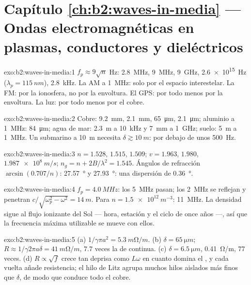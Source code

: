\section*{Capítulo \ref{ch:b2:waves-in-media} --- Ondas electromagnéticas en plasmas, conductores y dieléctricos}

\begin{solution}{exo:b2:waves-in-media:1}
$f_p \approx 9\sqrt n$ Hz: \qty{2.8}{MHz}, \qty{9}{MHz}, \qty{9}{GHz}, \qty{2.6e15}{Hz}
($\lambda_p = \qty{115}{nm}$), \qty{2.8}{kHz}. La AM a \qty{1}{MHz}: solo por el
espacio interestelar. La FM: por la ionosfera, no por la envoltura. El GPS:
por todo menos por la envoltura. La luz: por todo menos por el cobre.
\end{solution}

\begin{solution}{exo:b2:waves-in-media:2}
Cobre: \qty{9.2}{mm}, \qty{2.1}{mm}, \qty{65}{\micro m}, \qty{2.1}{\micro m}; aluminio a
\qty{1}{MHz}: \qty{84}{\micro m}; agua de mar: \qty{2.3}{m} a \qty{10}{kHz} y \qty{7}{mm} a
\qty{1}{GHz}; suelo: \qty{5}{m} a \qty{1}{MHz}. Un submarino a \qty{10}{m} necesita $\delta
\gtrsim \qty{10}{m}$: por debajo de unos \qty{500}{Hz}.
\end{solution}

\begin{solution}{exo:b2:waves-in-media:3}
$n = 1.528$, $1.515$, $1.509$; $v = 1.963$, $1.980$, $\qty{1.987e8}{m/s}$; $n_g = n +
2B/\lambda^2 = 1.545$. Ángulos de refracción $\arcsin(0.707/n)$: \qty{27.57}{\degree} y
\qty{27.93}{\degree}: una dispersión de \qty{0.36}{\degree}.
\end{solution}

\begin{solution}{exo:b2:waves-in-media:4}
$f_p = \qty{4.0}{MHz}$: los \qty{5}{MHz} pasan; los \qty{2}{MHz} se reflejan y penetran
$c/\sqrt{\omega_p^2 - \omega^2} = \qty{14}{m}$. Para $n = \qty{1.5e12}{m^{-3}}$: \qty{11}{MHz}. La
densidad sigue al flujo ionizante del Sol --- hora, estación y el
ciclo de once años ---, así que la frecuencia máxima utilizable se mueve con ellos.
\end{solution}

\begin{solution}{exo:b2:waves-in-media:5}
(a) $1/\gamma\pi a^2 = \qty{5.3}{m\ohm/m}$. (b) $\delta = \qty{65}{\micro m}$; $R \approx 1/\gamma2\pi a\delta
= \qty{41}{m\ohm/m}$, $7.7$ veces la de continua. (c) $\delta = \qty{6.5}{\micro m}$, \qty{0.41}{\ohm/m},
$77$ veces. (d) $R \propto \sqrt f$ crece tan deprisa como $L\omega$ en cuanto domina
el , y cada vuelta añade resistencia; el hilo de Litz agrupa muchos
hilos aislados más finos que $\delta$, de modo que conduce todo el cobre.
\end{solution}

